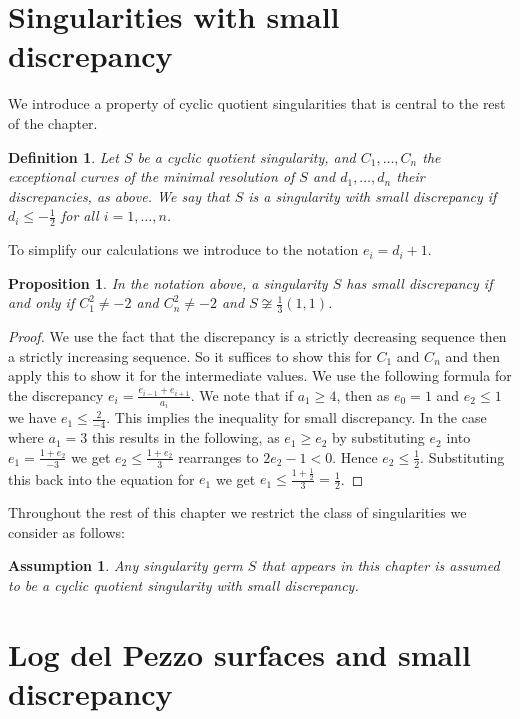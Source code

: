 \documentclass[12pt]{amsbook}
\theoremstyle{plain}
\newtheorem{prop}[thm]{Proposition}
\newtheorem{dfn}[thm]{Definition}
\newtheorem{assumption}[thm]{Assumption}
\begin{document}
\section{Singularities with small discrepancy}


We introduce a property of cyclic quotient singularities that is central to the rest of the chapter.
\begin{dfn}
Let $S$ be a cyclic quotient singularity, and $C_1, \dots ,C_n$ the exceptional curves of the minimal resolution of $S$ and $d_1, \dots,d_n$ their discrepancies, as above.
We say that $S$ is a \emph{singularity with small discrepancy} if $d_i \leq -\frac{1}{2}$ for
all $i=1,\dots,n$.
\end{dfn}

To simplify our calculations we introduce to the notation $e_i = d_i + 1$. 

\begin{prop}\label{small prop}
In the notation above,
a singularity $S$ has small discrepancy if and only if $C_1^2 \neq -2$ and $C_n^2 \neq -2$ and $ S \not\cong \frac{1}{3}(1,1)$.
\end{prop}
\begin{proof}
 We use the fact that the discrepancy is a strictly decreasing sequence then a strictly increasing sequence. So it suffices to show this for $C_1$ and $C_n$ and then apply this to show it for the intermediate values. We use the following formula for the discrepancy $e_i =  \frac{e_{i-1}+e_{i+1}}{a_i}$. We note that if $a_1 \geq 4$, then as $e_0 = 1$ and $e_2 \leq 1$ we have $e_1 \leq \frac{2}{-4}$. This implies the inequality for small discrepancy. In the case where $a_1 = 3$ this results in the following, as $e_1 \geq e_2$ by substituting $e_2$ into $e_1 = \frac{1 + e_2}{-3}$ we get  $ e_2 \leq \frac{1 + e_2}{3}$ rearranges to $2e_2 - 1 < 0$. Hence $e_2 \leq \frac{1}{2}$. Substituting this back into the equation for $e_1$ we get $e_1 \leq  \frac{1+ \frac{1}{2}}{3} =  \frac{1}{2}$. 
 \end{proof}


Throughout the rest of this chapter we restrict the class of singularities we consider as follows:

\begin{assumption}
Any singularity germ $S$ that appears in this chapter is assumed to be a cyclic
quotient singularity with small discrepancy.
\end{assumption}

\section{Log del Pezzo surfaces and small discrepancy}
\end{document}

